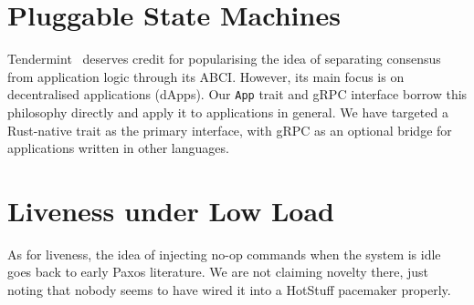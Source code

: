 \section{Pluggable State Machines}

Tendermint~\cite{tendermint} deserves credit for popularising the idea
of separating consensus from application logic through its ABCI.
However, its main focus is on decentralised applications (dApps).  Our
\texttt{App} trait and gRPC interface borrow this philosophy directly
and apply it to applications in general.  We have targeted a
Rust-native trait as the primary interface, with gRPC as an optional
bridge for applications written in other languages.

\section{Liveness under Low Load}

As for liveness, the idea of injecting no-op commands when the system
is idle goes back to early Paxos literature.  We are not claiming
novelty there, just noting that nobody seems to have wired it into a
HotStuff pacemaker properly.
